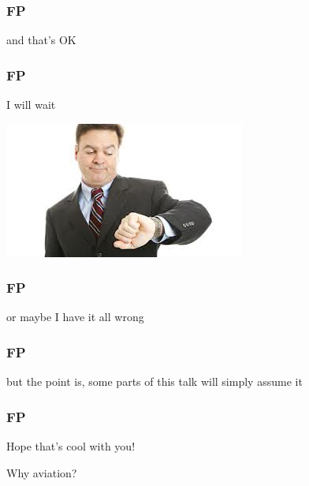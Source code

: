 \begin{frame}
\frametitle{FP}
\begin{center}
and that's OK
\end{center}
\end{frame}

\begin{frame}
\frametitle{FP}
\begin{center}
I will wait

\includegraphics[height=0.1\textheight]{image/man-looking-at-watch.jpg}
\end{center}
\end{frame}

\begin{frame}
\frametitle{FP}
\begin{center}
or maybe I have it all wrong
\end{center}
\end{frame}

\begin{frame}
\frametitle{FP}
\begin{center}
but the point is, some parts of this talk will simply assume it
\end{center}
\end{frame}

\begin{frame}
\frametitle{FP}
\begin{center}
Hope that's cool with you!
\end{center}
\end{frame}

\begin{frame}
\begin{center}
Why aviation?
\end{center}
\end{frame}

